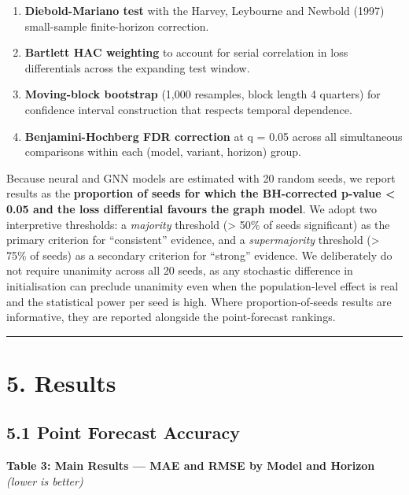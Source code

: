\documentclass[
]{article}
\providecommand{\tightlist}{%
  \setlength{\itemsep}{0pt}\setlength{\parskip}{0pt}}
\begin{document}
\begin{enumerate}
\def\labelenumi{\arabic{enumi}.}
\tightlist
\item
  \textbf{Diebold-Mariano test} with the Harvey, Leybourne and Newbold
  (1997) small-sample finite-horizon correction.
\item
  \textbf{Bartlett HAC weighting} to account for serial correlation in
  loss differentials across the expanding test window.
\item
  \textbf{Moving-block bootstrap} (1,000 resamples, block length 4
  quarters) for confidence interval construction that respects temporal
  dependence.
\item
  \textbf{Benjamini-Hochberg FDR correction} at q = 0.05 across all
  simultaneous comparisons within each (model, variant, horizon) group.
\end{enumerate}

Because neural and GNN models are estimated with 20 random seeds, we
report results as the \textbf{proportion of seeds for which the
BH-corrected p-value \textless{} 0.05 and the loss differential favours
the graph model}. We adopt two interpretive thresholds: a
\emph{majority} threshold (\textgreater{} 50\% of seeds significant) as
the primary criterion for ``consistent'' evidence, and a
\emph{supermajority} threshold (\textgreater{} 75\% of seeds) as a
secondary criterion for ``strong'' evidence. We deliberately do not
require unanimity across all 20 seeds, as any stochastic difference in
initialisation can preclude unanimity even when the population-level
effect is real and the statistical power per seed is high. Where
proportion-of-seeds results are informative, they are reported alongside
the point-forecast rankings.

\begin{center}\rule{0.5\linewidth}{0.5pt}\end{center}

\section{5. Results}\label{results}

\subsection{5.1 Point Forecast Accuracy}\label{point-forecast-accuracy}

\textbf{Table 3: Main Results --- MAE and RMSE by Model and Horizon}
\emph{(lower is better)}
\end{document}
